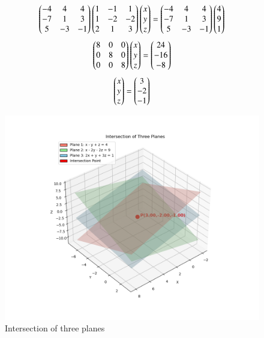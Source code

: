\documentclass{beamer}
\begin{document}
\begin{frame}
\begin{align}
    \begin{pmatrix}-4 & 4 & 4 \\
-7 & 1 & 3 \\
5 & -3 & -1\end{pmatrix} \begin{pmatrix}1 & -1 & 1\\
       1 & -2 & -2\\
       2 & 1 & 3\end{pmatrix}\begin{pmatrix}x \\ y \\z\end{pmatrix}=\begin{pmatrix}-4 & 4 & 4 \\
-7 & 1 & 3 \\
5 & -3 & -1\end{pmatrix}\begin{pmatrix}4\\9\\1\end{pmatrix}
\end{align}
\begin{align}
    \begin{pmatrix}8 & 0 & 0 \\
      0 & 8 & 0 \\
      0 & 0 & 8\end{pmatrix}
\begin{pmatrix}x \\ y \\ z\end{pmatrix}
= 
\begin{pmatrix}24 \\ -16 \\ -8\end{pmatrix}
\end{align}
\begin{align}
    \begin{pmatrix}x \\ y \\ z\end{pmatrix}
= 
\begin{pmatrix}3 \\ -2 \\ -1\end{pmatrix}
\end{align}
\end{frame}
\begin{frame}
\begin{figure}[H]
    \centering
    \includegraphics[width=0.5\linewidth]{figures/planes_intersection_c.png}
    \caption{Intersection of three planes}
    \label{fig:placeholder}
\end{figure}




\end{frame}
\end{document}
